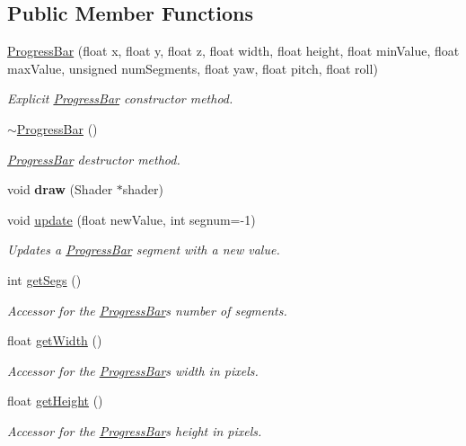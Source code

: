 \subsection*{Public Member Functions}
\begin{DoxyCompactItemize}
\item 
\hyperlink{classtsgl_1_1_progress_bar_a281955835a4dca417e17b8c158d3b907}{Progress\+Bar} (float x, float y, float z, float width, float height, float min\+Value, float max\+Value, unsigned num\+Segments, float yaw, float pitch, float roll)
\begin{DoxyCompactList}\small\item\em Explicit \hyperlink{classtsgl_1_1_progress_bar}{Progress\+Bar} constructor method. \end{DoxyCompactList}\item 
\hyperlink{classtsgl_1_1_progress_bar_aa3ad600db2cbd0e8f9221c264535df21}{$\sim$\+Progress\+Bar} ()
\begin{DoxyCompactList}\small\item\em \hyperlink{classtsgl_1_1_progress_bar}{Progress\+Bar} destructor method. \end{DoxyCompactList}\item 
\mbox{\label{classtsgl_1_1_progress_bar_a4fe29f8ca84e7e2fa11eddf1d4219ec5}} 
void {\bfseries draw} (Shader $\ast$shader)
\item 
void \hyperlink{classtsgl_1_1_progress_bar_a4274998e4935f33eb9212b2174d9c0c5}{update} (float new\+Value, int segnum=-\/1)
\begin{DoxyCompactList}\small\item\em Updates a \hyperlink{classtsgl_1_1_progress_bar}{Progress\+Bar} segment with a new value. \end{DoxyCompactList}\item 
int \hyperlink{classtsgl_1_1_progress_bar_a25576903783f18f8d74570aed2f80d95}{get\+Segs} ()
\begin{DoxyCompactList}\small\item\em Accessor for the \hyperlink{classtsgl_1_1_progress_bar}{Progress\+Bar}\textquotesingle{}s number of segments. \end{DoxyCompactList}\item 
float \hyperlink{classtsgl_1_1_progress_bar_ab781b1c8a4b68b9a875dba3773577747}{get\+Width} ()
\begin{DoxyCompactList}\small\item\em Accessor for the \hyperlink{classtsgl_1_1_progress_bar}{Progress\+Bar}\textquotesingle{}s width in pixels. \end{DoxyCompactList}\item 
float \hyperlink{classtsgl_1_1_progress_bar_a07b0b55587b0b05b09d1ccf61602dc4e}{get\+Height} ()
\begin{DoxyCompactList}\small\item\em Accessor for the \hyperlink{classtsgl_1_1_progress_bar}{Progress\+Bar}\textquotesingle{}s height in pixels. \end{DoxyCompactList}\end{DoxyCompactItemize}

